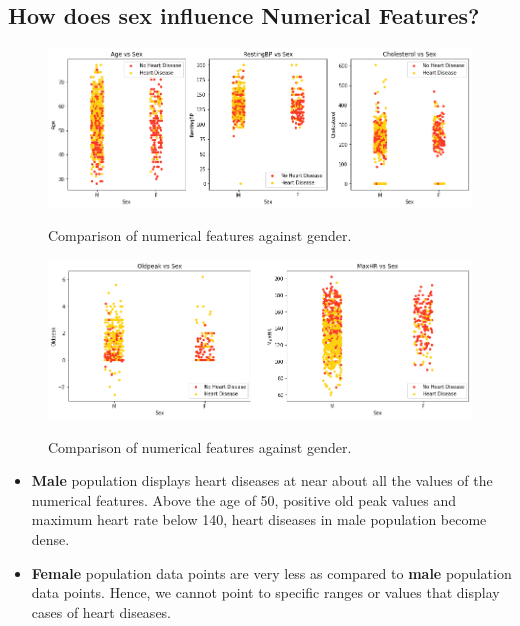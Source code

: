\subsection{How does sex influence Numerical Features?}
\begin{figure}[!htpb]
    \centering
    \includegraphics[width=0.7\linewidth]{Figures/Outputs/sex-num-fea.png}
    \label{Comparison between numerical features against gender}
    \caption{Comparison of numerical features against gender.}
\end{figure}
\begin{figure}[!htpb]
    \centering
    \includegraphics[width=0.7\linewidth]{Figures/Outputs/sex-num-fea2.png}
    \label{Comparison between numerical features against gender}
    \caption{Comparison of numerical features against gender.}
\end{figure}
\begin{itemize}
    \item \textbf{Male} population displays heart diseases at near about all the values of the numerical features. Above the age of 50, positive old peak values and maximum heart rate below 140, heart diseases in male population become dense.
    \item \textbf{Female} population data points are very less as compared to \textbf{male} population data points. Hence, we cannot point to specific ranges or values that display cases of heart diseases. 
\end{itemize}

